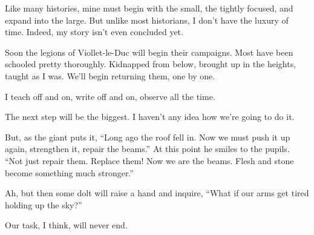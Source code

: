 Like many histories, mine must begin with the small, the tightly focused, and expand into the large. But unlike most historians, I don’t have the luxury of time. Indeed, my story isn’t even concluded yet.

Soon the legions of Viollet-le-Duc will begin their campaigns. Most have been schooled pretty thoroughly. Kidnapped from below, brought up in the heights, taught as I was. We’ll begin returning them, one by one.

I teach off and on, write off and on, observe all the time.

The next step will be the biggest. I haven’t any idea how we’re going to do it.

But, as the giant puts it, “Long ago the roof fell in. Now we must push it up again, strengthen it, repair the beams.” At this point he smiles to the pupils. “Not just repair them. Replace them! Now we are the beams. Flesh and stone become something much stronger.”

Ah, but then some dolt will raise a hand and inquire, “What if our arms get tired holding up the sky?”

Our task, I think, will never end.